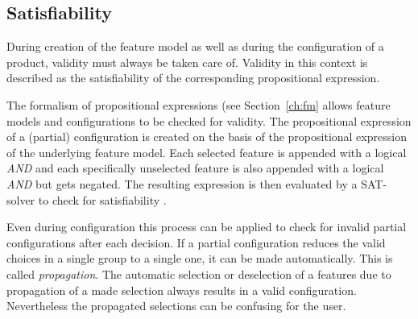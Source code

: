 \subsection{Satisfiability} \label{ch:sat}
During creation of the feature model as well as during the configuration of a product, validity must always be taken care of. Validity in this context is described as the satisfiability of the corresponding propositional expression.

The formalism of propositional expressions (see Section~\ref{ch:fm} allows feature models and configurations to be checked for validity. The propositional expression of a (partial) configuration is created on the basis of the propositional expression of the underlying feature model. Each selected feature is appended with a logical \textit{AND} and each specifically unselected feature is also appended with a logical \textit{AND} but gets negated. The resulting expression is then evaluated by a SAT-solver to check for satisfiability \cite{sat-solve}.

Even during configuration this process can be applied to check for invalid partial configurations after each decision. If a partial configuration reduces the valid choices in a single group to a single one, it can be made automatically. This is called \textit{propagation}. The automatic selection or deselection of a features due to propagation of a made selection always results in a valid configuration. Nevertheless the propagated selections can be confusing for the user.